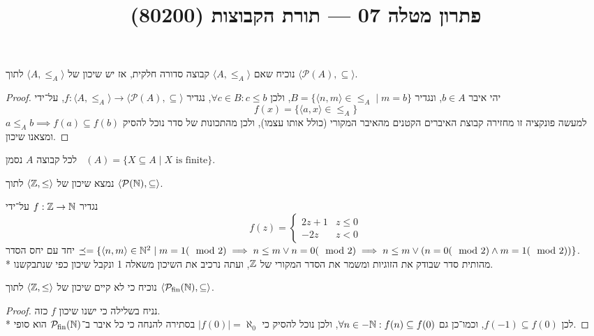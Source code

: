 
\title{פתרון מטלה 07 --- תורת הקבוצות (80200)}

\DeclareMathOperator\Pfin{\mathcal{P}_\text{fin}}
\DeclareMathOperator\lex{\le_\text{lex}}

\maketitle
\maketitleprint{}

\Question{}
נוכיח שאם $\langle A, \le_A \rangle$ קבוצה סדורה חלקית, אז יש שיכון של $\langle A, \le_A \rangle$ לתוך $\langle \mathcal{P}(A), \subseteq \rangle$.
\begin{proof}
	יהי איבר $b \in A$, ונגדיר $B = \{ \langle n, m \rangle \in \le_A \mid m = b \}$, ולכן $\forall c \in B : c \le b$, נגדיר $f : \langle A, \le_A \rangle \to \langle \mathcal{P}(A), \subseteq \rangle$, על־ידי
	\[
		f(x) = \{ \langle a, x \rangle \in \le_A \}
	\]
	למעשה פונקציה זו מחזירה קבוצת האיברים הקטנים מהאיבר המקורי (כולל אותו עצמו), ולכן מהתכונות של סדר נוכל להסיק $a \le_A b \implies f(a) \subseteq f(b)$ ומצאנו שיכון.
\end{proof}

\Question{}
לכל קבוצה $A$ נסמן $\Pfin(A) = \{ X \subseteq A \mid X \text{ is finite} \}$.

\Subquestion{}
נמצא שיכון של $\langle \mathbb{Z}, \le \rangle$ לתוך $\langle \mathcal{P}(\mathbb{N}), \subseteq \rangle$.

נגדיר $f : \mathbb{Z} \to \mathbb{N}$ על־ידי
\[
	f(z) = \begin{cases}
		2z + 1 & z \le 0 \\
		-2z & z < 0
	\end{cases}
\]
יחד עם יחס הסדר $\preceq = \{ \langle n, m \rangle \in \mathbb{N}^2 \mid m = 1 (\mod 2) \implies n \le m \lor n = 0 (\mod 2) \implies n \le m \lor (n = 0 (\mod 2) \land m = 1 (\mod 2)) \}$. \\*
מהותית סדר שבודק את הזוגיות ומשמר את הסדר המקורי של $\mathbb{Z}$, ועתה נרכיב את השיכון משאלה 1 ונקבל שיכון כפי שנתבקשנו.

\Subquestion{}
נוכיח כי לא קיים שיכון של $\langle \mathbb{Z}, \le \rangle$ לתוך $\langle \Pfin(\NN), \subseteq \rangle$.
\begin{proof}
	נניח בשלילה כי ישנו שיכון $f$ כזה. \\*
	לכן $f(-1) \subseteq f(0)$, וכמו־כן גם $\forall n \in -\mathbb{N} : f(n) \subseteq f(0)$, ולכן נוכל להסיק כי $|f(0)| = \aleph_0$ בסתירה להנחה כי כל איבר ב־$\Pfin(\NN)$ הוא סופי.
\end{proof}

